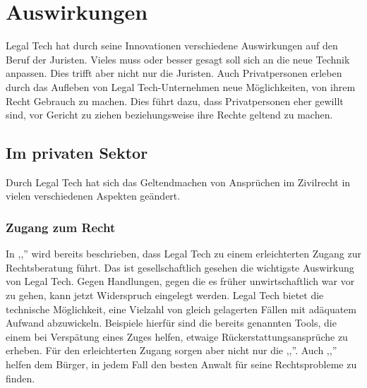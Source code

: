 \chapter{Auswirkungen}
Legal Tech hat durch seine Innovationen verschiedene Auswirkungen auf den Beruf der Juristen. Vieles muss oder besser gesagt soll sich an die neue Technik anpassen. Dies trifft aber nicht nur die Juristen. Auch Privatpersonen erleben durch das Aufleben von Legal Tech-Unternehmen neue Möglichkeiten, von ihrem Recht Gebrauch zu machen. Dies führt dazu, dass Privatpersonen eher gewillt sind, vor Gericht zu ziehen beziehungsweise ihre Rechte geltend zu machen. 
\section{Im privaten Sektor}
Durch Legal Tech hat sich das Geltendmachen von Ansprüchen im Zivilrecht in vielen verschiedenen Aspekten geändert. 
\subsection{Zugang zum Recht}
In ,,'' wird bereits beschrieben, dass Legal Tech zu einem erleichterten Zugang zur Rechtsberatung führt. Das ist gesellschaftlich gesehen die wichtigste Auswirkung von Legal Tech. Gegen Handlungen, gegen die es früher unwirtschaftlich war vor zu gehen, kann jetzt Widerspruch eingelegt werden. Legal Tech bietet die technische Möglichkeit, eine Vielzahl von gleich gelagerten Fällen mit adäquatem Aufwand abzuwickeln. Beispiele hierfür sind die bereits genannten Tools, die einem  bei Verspätung eines Zuges helfen, etwaige Rückerstattungsansprüche zu erheben.
Für den erleichterten Zugang sorgen aber nicht nur die ,,''. Auch ,,'' helfen dem Bürger, in jedem Fall den besten Anwalt für seine Rechtsprobleme zu finden. 

